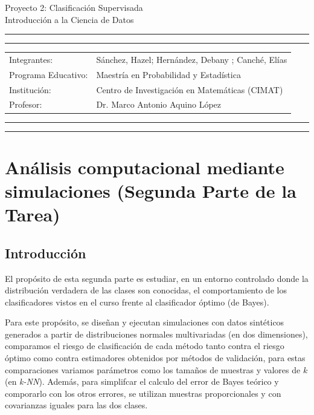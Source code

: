 \documentclass[10pt]{article}
\newcommand{\studentname}{Sánchez, Hazel; Hernández, Debany ; Canché, Elías}
\newcommand{\researchcentre}{Maestría en Probabilidad y Estadística}
\newcommand{\institution}{Centro de Investigación en Matemáticas (CIMAT)}
\newcommand{\supervisor}{Dr. Marco Antonio Aquino López}
\begin{document}
\begin{center}
{\Large{Proyecto 2: Clasificación Supervisada}} \\
\vspace{2mm}
{\Large{Introducción a la Ciencia de Datos}} \\
\end{center}

\vspace{5mm}
\hrule
\vspace{1mm}
\hrule

\vspace{3mm}
\begin{tabular}{ll} 
Integrantes:           	        & {\studentname}   \\ 
Programa Educativo: 	        & {\researchcentre}  \\ 
Institución:                 & {\institution}  \\
Profesor: 	                 & {\supervisor}  \\ 
\end{tabular}

\vspace{3mm}
\hrule
\vspace{1mm}
\hrule

\begin{abstract}

\end{abstract}
\section{Análisis computacional mediante simulaciones (Segunda Parte de la Tarea)}

\subsection*{Introducción}

El propósito de esta segunda parte es estudiar, en un entorno controlado donde
la distribución verdadera de las clases son conocidas, el comportamiento de los
clasificadores vistos en el curso frente al clasificador óptimo (de Bayes).

Para este propósito, se diseñan y ejecutan simulaciones con datos sintéticos
generados a partir de distribuciones normales multivariadas (en dos
dimensiones), comparamos el riesgo de clasificación de cada método tanto contra
el riesgo óptimo como contra estimadores obtenidos por métodos de validación, 
para estas comparaciones variamos parámetros como los tamaños de muestras y
valores de $k$ (en \textit{k-NN}). Además, para simplifcar el calculo del error
de Bayes teórico y comporarlo con los otros errores, se utilizan muestras
proporcionales y con covarianzas iguales para las dos clases.
\end{document}
